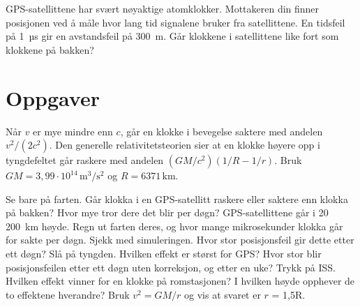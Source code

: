 \documentclass[11pt]{article}
\begin{document}

GPS-satellittene har svært nøyaktige atomklokker. Mottakeren din finner posisjonen ved å måle hvor lang tid signalene bruker fra satellittene. En tidsfeil på 1~µs gir en avstandsfeil på 300~m. Går klokkene i satellittene like fort som klokkene på bakken?

\section*{Oppgaver}

Når $v$ er mye mindre enn $c$, går en klokke i bevegelse saktere med andelen $v^{2}/(2c^{2})$. Den generelle relativitetsteorien sier at en klokke høyere opp i tyngdefeltet går raskere med andelen $(GM/c^{2})(1/R - 1/r)$. Bruk $GM = 3{,}99 \cdot 10^{14}\,\mathrm{m^{3}/s^{2}}$ og $R = 6371\,\mathrm{km}$.

\begin{oppgaveliste}
\oppgave {}Se bare på farten. Går klokka i en GPS-satellitt raskere eller saktere enn klokka på bakken? Hvor mye tror dere det blir per døgn?
\svar
\oppgave {}GPS-satellittene går i 20 200~km høyde. Regn ut farten deres, og hvor mange mikrosekunder klokka går for sakte per døgn. Sjekk med simuleringen.
\svar
\oppgave {}Hvor stor posisjonsfeil gir dette etter ett døgn?
\svar
\oppgave {}Slå på tyngden. Hvilken effekt er størst for GPS? Hvor stor blir posisjonsfeilen etter ett døgn uten korreksjon, og etter en uke?
\svar
\oppgave {}Trykk på ISS. Hvilken effekt vinner for en klokke på romstasjonen?
\svar
\oppgave {}I hvilken høyde opphever de to effektene hverandre? Bruk $v^{2} = GM/r$ og vis at svaret er $r$ = 1,5R.
\svar
\end{oppgaveliste}
\end{document}
